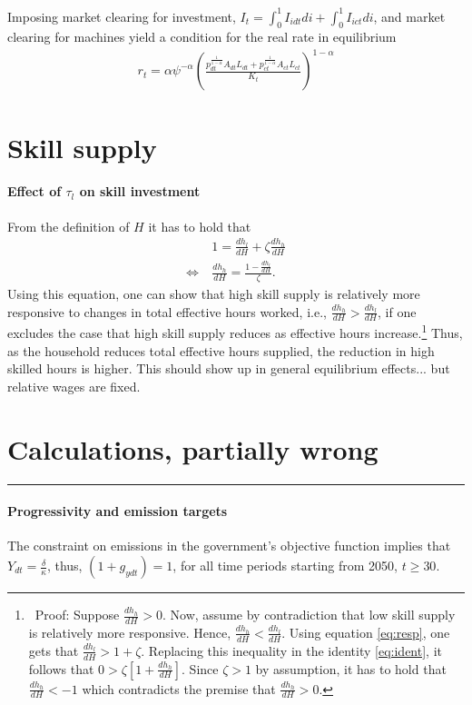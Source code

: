 Imposing market clearing for investment, $I_t=\int_{0}^{1}I_{idt}di+\int_{0}^{1}I_{ict}di$, and market clearing for machines yield a condition for the real rate in equilibrium
\begin{align*}
r_t=\alpha \psi^{-\alpha}\left(\frac{p_{dt}^{\frac{1}{1-\alpha}}A_{dt}L_{dt}+p_{ct}^{\frac{1}{1-\alpha}}A_{ct}L_{ct}}{K_t}\right)^{1-\alpha}
\end{align*}

\section{Skill supply}
\paragraph{Effect of $\tau_l$ on skill investment}
From the definition of $H$ it has to hold that 
\begin{align}
&1=\frac{dh_l}{dH}+\zeta \frac{dh_h}{dH}\label{eq:ident} \\
\Leftrightarrow\ & \frac{dh_h}{dH}=\frac{1-\frac{dh_l}{dH}}{\zeta}.\label{eq:resp}
\end{align}
Using this equation, one can show that high skill supply is relatively more responsive to changes in total effective hours worked, i.e.,  $\frac{dh_h}{dH}>\frac{dh_l}{dH}$, if one excludes the case that high skill supply reduces as effective hours increase.\footnote{\ Proof: Suppose   $\frac{dh_h}{dH}>0$. Now, assume by contradiction that low skill supply is relatively more responsive. Hence, $\frac{dh_h}{dH}<\frac{dh_l}{dH}$. Using equation \ref{eq:resp}, one gets that $\frac{dh_l}{dH}>1+\zeta$. Replacing this inequality in the identity \ref{eq:ident}, it follows that $0>\zeta[1+\frac{dh_h}{dH}]$. Since $\zeta>1$ by assumption, it has to hold that $\frac{dh_h}{dH}<-1$ which contradicts the premise that $\frac{dh_h}{dH}>0$. } Thus, as the household reduces total effective hours supplied, the reduction in high skilled hours is higher.  This should show up in general equilibrium effects... but relative wages are fixed. 


\section{Calculations, partially wrong}
\noindent\rule[1ex]{\textwidth}{1pt}

\paragraph{Progressivity and emission targets}
The constraint on emissions in the government's objective function implies that $Y_{dt}=\frac{\delta}{\kappa}$, thus, $(1+g_{ydt})=1$, for all time periods starting from 2050, $t\geq 30$. 

